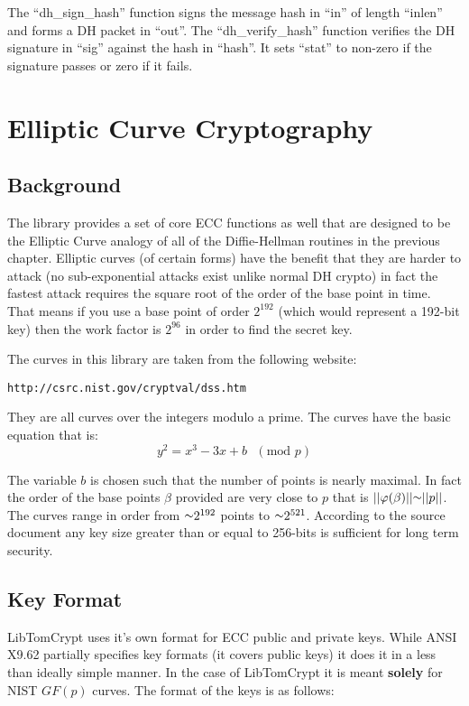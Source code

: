 \documentclass[a4paper]{book}
\def\approx{\raisebox{0.2ex}{\mbox{\small $\sim$}}}
\def\phi{\varphi}
\begin{document}
The ``dh\_sign\_hash'' function signs the message hash in ``in'' of length ``inlen'' and forms a DH packet in ``out''.  
The ``dh\_verify\_hash'' function verifies the DH signature in ``sig'' against the hash in ``hash''.  It sets ``stat''
to non-zero if the signature passes or zero if it fails.

\chapter{Elliptic Curve Cryptography}

\section{Background}
The library provides a set of core ECC functions as well that are designed to be the Elliptic Curve analogy of all of the 
Diffie-Hellman routines in the previous chapter.  Elliptic curves (of certain forms) have the benefit that they are harder
to attack (no sub-exponential attacks exist unlike normal DH crypto) in fact the fastest attack requires the square root
of the order of the base point in time.  That means if you use a base point of order $2^{192}$ (which would represent a
192-bit key) then the work factor is $2^{96}$ in order to find the secret key.

The curves in this library are taken from the following website:
\begin{verbatim}
http://csrc.nist.gov/cryptval/dss.htm
\end{verbatim}

They are all curves over the integers modulo a prime.  The curves have the basic equation that is:
\begin{equation}
y^2 = x^3 - 3x + b\mbox{ }(\mbox{mod }p)
\end{equation}

The variable $b$ is chosen such that the number of points is nearly maximal.  In fact the order of the base points $\beta$ 
provided are very close to $p$ that is $\vert \vert \phi(\beta) \vert \vert \approx \vert \vert p \vert \vert$.  The curves
range in order from $\approx 2^{192}$ points to $\approx 2^{521}$.  According to the source document any key size greater
than or equal to 256-bits is sufficient for long term security.  

\section{Key Format}
LibTomCrypt uses it's own format for ECC public and private keys.  While ANSI X9.62 partially specifies key formats (it covers public keys) it does it in a less
than ideally simple manner.  In the case of LibTomCrypt it is meant \textbf{solely} for NIST $GF(p)$ curves.  The format of the keys is as follows:
\end{document}
